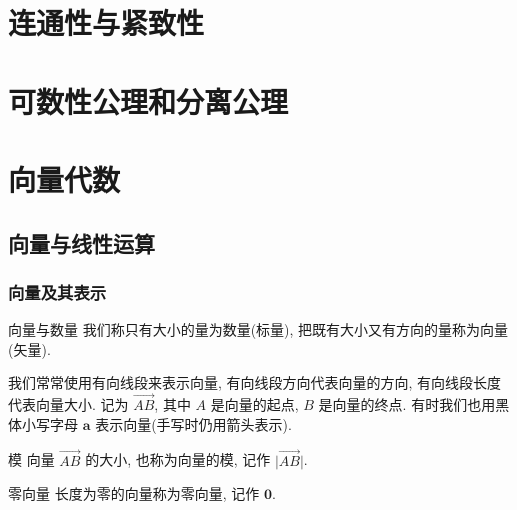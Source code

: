 \documentclass[cn,toc=twocol]{elegantbook}
\newcommand{\ve}[1]{\boldsymbol{#1}}
\newcommand{\Ve}[1]{\overrightarrow{#1}}
\begin{document}
\chapter{连通性与紧致性}


\chapter{可数性公理和分离公理}


\chapter{向量代数}
\section{向量与线性运算}

\subsection{向量及其表示}

\begin{definition}{向量与数量}
	我们称只有大小的量为数量(标量), 把既有大小又有方向的量称为向量(矢量).
\end{definition}

我们常常使用有向线段来表示向量, 有向线段方向代表向量的方向, 有向线段长度代表向量大小. 记为 $\Ve{AB}$, 其中 $A$ 是向量的起点, $B$ 是向量的终点. 有时我们也用黑体小写字母 $\ve a$ 表示向量(手写时仍用箭头表示).

\begin{definition}{模}
	向量 $\Ve{AB}$ 的大小, 也称为向量的模, 记作 $\lvert \Ve{AB} \rvert$.
\end{definition}

\begin{definition}{零向量}
	长度为零的向量称为零向量, 记作 $\ve{0}$.	
\end{definition}
\end{document}
